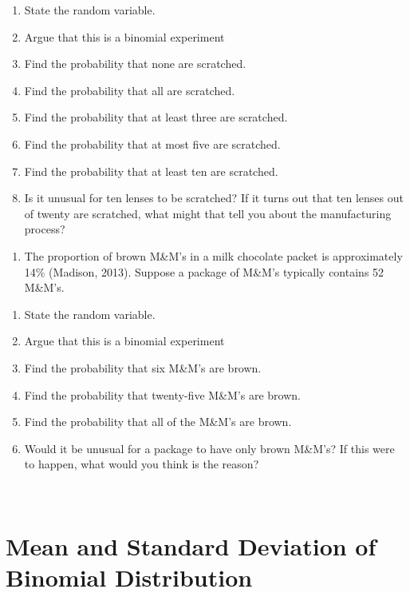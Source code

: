 \documentclass[]{book}
\providecommand{\tightlist}{%
  \setlength{\itemsep}{0pt}\setlength{\parskip}{0pt}}
\begin{document}
\begin{enumerate}
\def\labelenumi{\alph{enumi}.}
\tightlist
\item
  State the random variable.
\item
  Argue that this is a binomial experiment
\item
  Find the probability that none are scratched.
\item
  Find the probability that all are scratched.
\item
  Find the probability that at least three are scratched.
\item
  Find the probability that at most five are scratched.
\item
  Find the probability that at least ten are scratched.
\item
  Is it unusual for ten lenses to be scratched? If it turns out that ten lenses out of twenty are scratched, what might that tell you about the manufacturing process?
\end{enumerate}

\begin{enumerate}
\def\labelenumi{\arabic{enumi}.}
\setcounter{enumi}{3}
\tightlist
\item
  The proportion of brown M\&M's in a milk chocolate packet is approximately 14\% (Madison, 2013). Suppose a package of M\&M's typically contains 52 M\&M's.
\end{enumerate}

\begin{enumerate}
\def\labelenumi{\alph{enumi}.}
\tightlist
\item
  State the random variable.
\item
  Argue that this is a binomial experiment
\item
  Find the probability that six M\&M's are brown.
\item
  Find the probability that twenty-five M\&M's are brown.
\item
  Find the probability that all of the M\&M's are brown.
\item
  Would it be unusual for a package to have only brown M\&M's? If this were to happen, what would you think is the reason?
\end{enumerate}

\textbf{\\
}

\hypertarget{mean-and-standard-deviation-of-binomial-distribution}{%
\section{Mean and Standard Deviation of Binomial Distribution}\label{mean-and-standard-deviation-of-binomial-distribution}}
\end{document}
